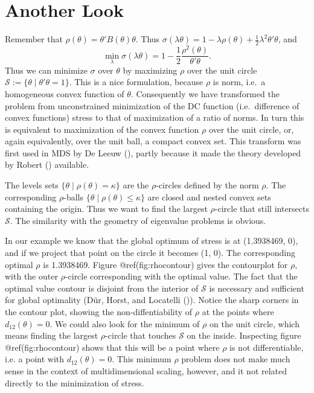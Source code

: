\documentclass[
  12pt,
  letterpaper,
  DIV=11,
  numbers=noendperiod]{scrreprt}
\theoremstyle{remark}
\begin{document}
\section{Another Look}\label{picsphere}

Remember that \(\rho(\theta)=\theta'B(\theta)\theta\). Thus
\(\sigma(\lambda\theta)=1-\lambda\rho(\theta)+\frac12\lambda^2\theta'\theta\),
and \[
\min_\lambda\sigma(\lambda\theta)=1-\frac12\frac{\rho^2(\theta)}{\theta'\theta}.
\] Thus we can minimize \(\sigma\) over \(\theta\) by maximizing
\(\rho\) over the unit circle
\(\mathcal{S}:=\{\theta\mid\theta'\theta=1\}\). This is a nice
formulation, because \(\rho\) is norm, i.e.~a homogeneous convex
function of \(\theta\). Consequently we have transformed the problem
from unconstrained minimization of the DC function (i.e.~difference of
convex functions) stress to that of maximization of a ratio of norms. In
turn this is equivalent to maximization of the convex function \(\rho\)
over the unit circle, or, again equivalently, over the unit ball, a
compact convex set. This transform was first used in MDS by De Leeuw
(), partly because it made the theory
developed by Robert () available.

The levels sets \(\{\theta\mid\rho(\theta)=\kappa\}\) are the
\(\rho\)-circles defined by the norm \(\rho\). The corresponding
\(\rho\)-balls \(\{\theta\mid\rho(\theta)\leq\kappa\}\) are closed and
nested convex sets containing the origin. Thus we want to find the
largest \(\rho\)-circle that still intersects \(\mathcal{S}\). The
similarity with the geometry of eigenvalue problems is obvious.

In our example we know that the global optimum of stress is at
(1.3938469, 0), and if we project that point on the circle it becomes
(1, 0). The corresponding optimal \(\rho\) is 1.3938469. Figure
@ref(fig:rhocontour) gives the contourplot for \(\rho\), with the outer
\(\rho\)-circle corresponding with the optimal value. The fact that the
optimal value contour is disjoint from the interior of \(\mathcal{S}\)
is necessary and sufficient for global optimality (Dür, Horst, and
Locatelli ()). Notice the
sharp corners in the contour plot, showing the non-diffentiability of
\(\rho\) at the points where \(d_{12}(\theta)=0\). We could also look
for the minimum of \(\rho\) on the unit circle, which means finding the
largest \(\rho\)-circle that touches \(\mathcal{S}\) on the inside.
Inspecting figure @ref(fig:rhocontour) shows that this will be a point
where \(\rho\) is not differentiable, i.e. a point with
\(d_{12}(\theta)=0\). This minimum \(\rho\) problem does not make much
sense in the context of multidimensional scaling, however, and it not
related directly to the minimization of stress.
\end{document}
